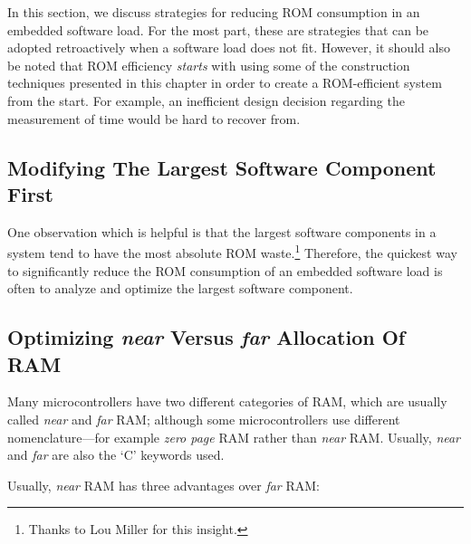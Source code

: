 In this section, we discuss strategies for reducing ROM consumption
in an embedded software load.  For the most part, these are strategies
that can be adopted retroactively when a software load does not fit.
However, it should also be noted that ROM efficiency \emph{starts}
with using some of the construction techniques presented in this chapter
in order to create a ROM-efficient system from the start.  For example, 
an inefficient design decision regarding the measurement of time
would be hard to recover from.


\subsection{Modifying The Largest Software Component First}
\label{cpco0:srrs0:smlf0}

One observation which is helpful is that the largest software components
in a system tend to have the most absolute ROM waste.\footnote{Thanks
to Lou Miller \cite{bibref:i:loumiller} for this insight.}  
Therefore, the quickest way to significantly reduce the ROM consumption
of an embedded software load is often to analyze and optimize the 
largest software component.


\subsection{Optimizing \emph{near} Versus \emph{far} Allocation Of RAM}
\label{cpco0:srrs0:snvf0}

Many microcontrollers have two different categories of RAM, which are
usually called \emph{near} and \emph{far} RAM; although some microcontrollers
use different nomenclature---for example \emph{zero page} RAM rather than
\emph{near} RAM.  Usually, \emph{near} and \emph{far} are also 
the `C' keywords used.

Usually, \emph{near} RAM has three advantages over \emph{far} RAM:

